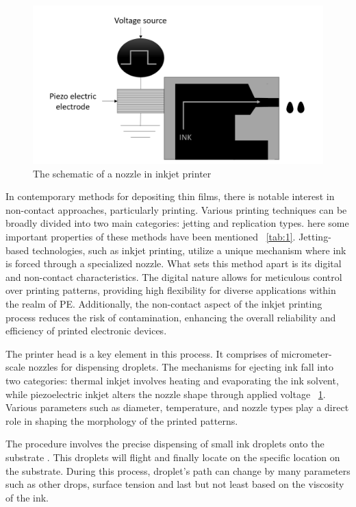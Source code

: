 \begin{figure}[h!]
\centering
\includegraphics[width=1\textwidth]{figures/fig11.png}
\caption[Example of caption.]{ The schematic of a nozzle in inkjet printer \label{fig11}}
\end{figure}




In contemporary methods for depositing thin films, there is notable interest in non-contact approaches, particularly printing.
Various printing techniques can be broadly divided into two main categories: jetting and replication types. here some important properties of these methods have been mentioned ~\ref{tab:1}. Jetting-based technologies, such as inkjet printing, utilize a unique mechanism where ink is forced through a specialized nozzle. What sets this method apart is its digital and non-contact characteristics. The digital nature allows for meticulous control over printing patterns, providing high flexibility for diverse applications within the realm of PE. Additionally, the non-contact aspect of the inkjet printing process reduces the risk of contamination, enhancing the overall reliability and efficiency of printed electronic devices.

The printer head is a key element in this process. It  comprises of micrometer-scale nozzles for dispensing droplets. The mechanisms for ejecting ink fall into two categories: thermal inkjet involves heating and evaporating the ink solvent, while piezoelectric inkjet alters the nozzle shape through applied voltage ~\ref{fig11}. Various parameters such as diameter, temperature, and nozzle types play a direct role in shaping the morphology of the printed patterns.


The procedure involves the precise dispensing of small ink droplets onto the substrate . This droplets will flight and finally locate on the specific location on the  substrate. During this process, droplet's path can change by many parameters such as other drops, surface tension and last but not least based on the viscosity of the ink. ~\cite{ref27}

